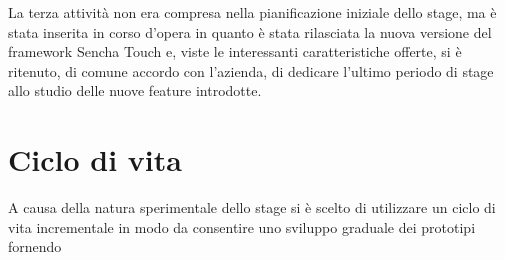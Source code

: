 La terza attività non era compresa nella pianificazione iniziale dello stage, ma è stata inserita in corso d'opera in quanto è stata rilasciata la nuova versione del framework Sencha Touch e, viste le interessanti caratteristiche offerte, si è ritenuto, di comune accordo con l'azienda, di dedicare l'ultimo periodo di stage allo studio delle nuove feature introdotte.

\section{Ciclo di vita}
A causa della natura sperimentale dello stage si è scelto di utilizzare un ciclo di vita incrementale in modo da consentire uno sviluppo graduale dei prototipi fornendo 